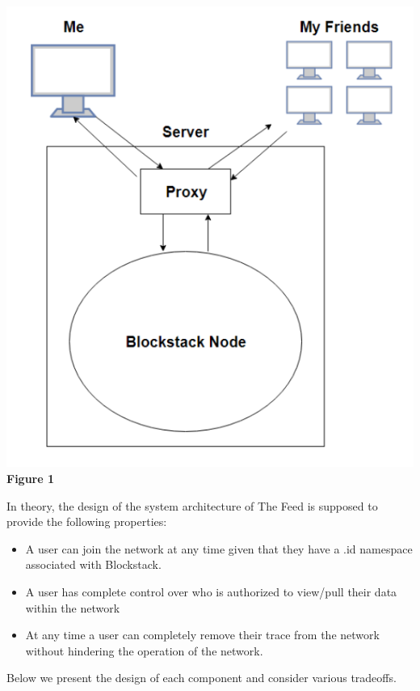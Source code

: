 \documentclass[pageno]{jpaper}
\begin{document}
\begin{multicols*}{2}
\begin{center}
	\includegraphics[scale=0.4]{pic1.jpg} \\
	\textbf{Figure 1}
\end{center}

In theory, the design of the system architecture of The Feed is supposed to provide the following properties:

\begin{center}
	\begin{itemize}
		\setlength{\itemsep}{2\baselineskip}
		\item A user can join the network at any time given that they have a .id namespace associated with Blockstack.
		\item A user has complete control over who is authorized to view/pull their data within the network
		\item At any time a user can completely remove their trace from the network without hindering the operation of the network.
	\end{itemize}
\end{center}

Below we present the design of each component and consider various tradeoffs.


\end{multicols*}
\end{document}
